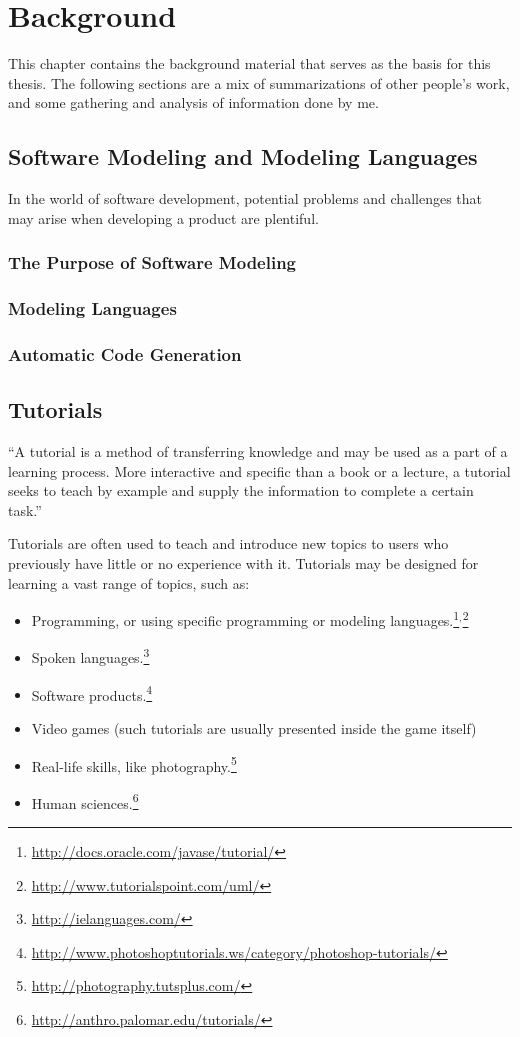 \chapter{Background}
\label{ch:background}
This chapter contains the background material that serves as the basis for this thesis. The following sections are a mix of summarizations of other people's work, and some gathering and analysis of information done by me.


\section{Software Modeling and Modeling Languages}
\label{sec:software_modeling}
In the world of software development, potential problems and challenges that may arise when developing a product are plentiful.


\subsection{The Purpose of Software Modeling}


\subsection{Modeling Languages}


\subsection{Automatic Code Generation}


\section{Tutorials}
\label{sec:tutorials}
``A tutorial is a method of transferring knowledge and may be used as a part of a learning process. More interactive and specific than a book or a lecture, a tutorial seeks to teach by example and supply the information to complete a certain task.''~\cite{wiki:tutorial}

\noindent
Tutorials are often used to teach and introduce new topics to users who previously have little or no experience with it. Tutorials may be designed for learning a vast range of topics, such as:
\begin{itemize}
	\item Programming, or using specific programming or modeling languages.\footnote{\url{http://docs.oracle.com/javase/tutorial/}}$^{,}$\footnote{\url{http://www.tutorialspoint.com/uml/}}
	\item Spoken languages.\footnote{\url{http://ielanguages.com/}}
	\item Software products.\footnote{\url{http://www.photoshoptutorials.ws/category/photoshop-tutorials/}}
	\item Video games (such tutorials are usually presented inside the game itself)
	\item Real-life skills, like photography.\footnote{\url{http://photography.tutsplus.com/}}
	\item Human sciences.\footnote{\url{http://anthro.palomar.edu/tutorials/}}
\end{itemize}

